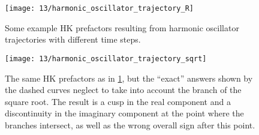 \begin{figure}
	\centering
	\texttt{[image: 13/harmonic\_oscillator\_trajectory\_R]}
	\caption[
		Example HK prefactors for harmonic oscillator
	]{
		Some example HK prefactors resulting from harmonic oscillator trajectories with different time steps.
		\explainplotsas{}
	}
	\label{fig:harmonic-oscillator-trajectory-b}
\end{figure}

\begin{figure}
	\centering
	\texttt{[image: 13/harmonic\_oscillator\_trajectory\_sqrt]}
	\caption[
		HK prefactors with incorrect square root branch
	]{
		The same HK prefactors as in \cref{fig:harmonic-oscillator-trajectory-b}, but the ``exact'' answers shown by the dashed curves neglect to take into account the branch of the square root.
		The result is a cusp in the real component and a discontinuity in the imaginary component at the point where the branches intersect, as well as the wrong overall sign after this point.
	}
	\label{fig:harmonic-oscillator-trajectory-sqrt}
\end{figure}

